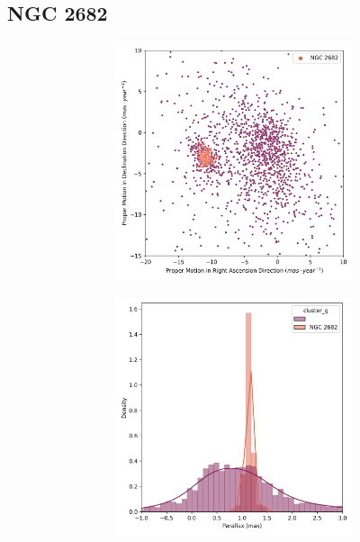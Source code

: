 \documentclass[11pt, a4paper, english]{book}
\begin{document}
\vfill

\newpage

\subsection{NGC 2682}

\begin{figure}[H]
  \vfil
  \centering
  \begin{subfigure}{0.9\textwidth}
    \centering
    \begin{subfigure}[t]{0.30\textwidth}
      \centering
      \includegraphics[width=\textwidth]{../figures/ngc_2682/pm_ngc_2682.png}
    \end{subfigure}
    \hfill
    \begin{subfigure}[t]{0.30\textwidth}
      \centering
      \includegraphics[width=\textwidth]{../figures/ngc_2682/parallax_ngc_2682.png}

\end{subfigure}
\end{subfigure}
\end{figure}
\end{document}
